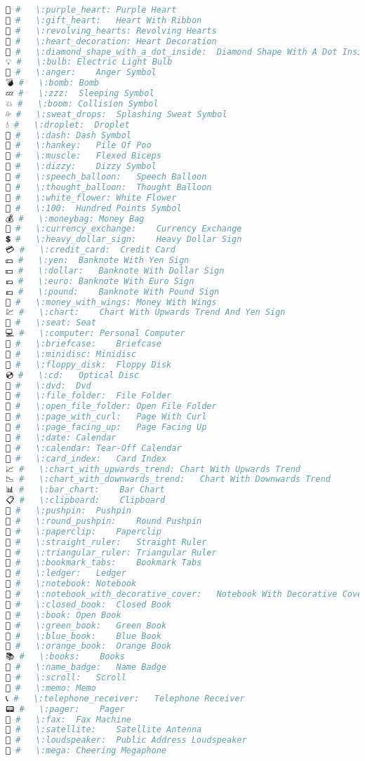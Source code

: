 \begin{lstlisting}[language=Julia]
💜 #   \:purple_heart: Purple Heart
💝 #   \:gift_heart:   Heart With Ribbon
💞 #   \:revolving_hearts: Revolving Hearts
💟 #   \:heart_decoration: Heart Decoration
💠 #   \:diamond_shape_with_a_dot_inside:  Diamond Shape With A Dot Inside
💡 #   \:bulb: Electric Light Bulb
💢 #   \:anger:    Anger Symbol
💣 #   \:bomb: Bomb
💤 #   \:zzz:  Sleeping Symbol
💥 #   \:boom: Collision Symbol
💦 #   \:sweat_drops:  Splashing Sweat Symbol
💧 #   \:droplet:  Droplet
💨 #   \:dash: Dash Symbol
💩 #   \:hankey:   Pile Of Poo
💪 #   \:muscle:   Flexed Biceps
💫 #   \:dizzy:    Dizzy Symbol
💬 #   \:speech_balloon:   Speech Balloon
💭 #   \:thought_balloon:  Thought Balloon
💮 #   \:white_flower: White Flower
💯 #   \:100:  Hundred Points Symbol
💰 #   \:moneybag: Money Bag
💱 #   \:currency_exchange:    Currency Exchange
💲 #   \:heavy_dollar_sign:    Heavy Dollar Sign
💳 #   \:credit_card:  Credit Card
💴 #   \:yen:  Banknote With Yen Sign
💵 #   \:dollar:   Banknote With Dollar Sign
💶 #   \:euro: Banknote With Euro Sign
💷 #   \:pound:    Banknote With Pound Sign
💸 #   \:money_with_wings: Money With Wings
💹 #   \:chart:    Chart With Upwards Trend And Yen Sign
💺 #   \:seat: Seat
💻 #   \:computer: Personal Computer
💼 #   \:briefcase:    Briefcase
💽 #   \:minidisc: Minidisc
💾 #   \:floppy_disk:  Floppy Disk
💿 #   \:cd:   Optical Disc
📀 #   \:dvd:  Dvd
📁 #   \:file_folder:  File Folder
📂 #   \:open_file_folder: Open File Folder
📃 #   \:page_with_curl:   Page With Curl
📄 #   \:page_facing_up:   Page Facing Up
📅 #   \:date: Calendar
📆 #   \:calendar: Tear-Off Calendar
📇 #   \:card_index:   Card Index
📈 #   \:chart_with_upwards_trend: Chart With Upwards Trend
📉 #   \:chart_with_downwards_trend:   Chart With Downwards Trend
📊 #   \:bar_chart:    Bar Chart
📋 #   \:clipboard:    Clipboard
📌 #   \:pushpin:  Pushpin
📍 #   \:round_pushpin:    Round Pushpin
📎 #   \:paperclip:    Paperclip
📏 #   \:straight_ruler:   Straight Ruler
📐 #   \:triangular_ruler: Triangular Ruler
📑 #   \:bookmark_tabs:    Bookmark Tabs
📒 #   \:ledger:   Ledger
📓 #   \:notebook: Notebook
📔 #   \:notebook_with_decorative_cover:   Notebook With Decorative Cover
📕 #   \:closed_book:  Closed Book
📖 #   \:book: Open Book
📗 #   \:green_book:   Green Book
📘 #   \:blue_book:    Blue Book
📙 #   \:orange_book:  Orange Book
📚 #   \:books:    Books
📛 #   \:name_badge:   Name Badge
📜 #   \:scroll:   Scroll
📝 #   \:memo: Memo
📞 #   \:telephone_receiver:   Telephone Receiver
📟 #   \:pager:    Pager
📠 #   \:fax:  Fax Machine
📡 #   \:satellite:    Satellite Antenna
📢 #   \:loudspeaker:  Public Address Loudspeaker
📣 #   \:mega: Cheering Megaphone

\end{lstlisting}
